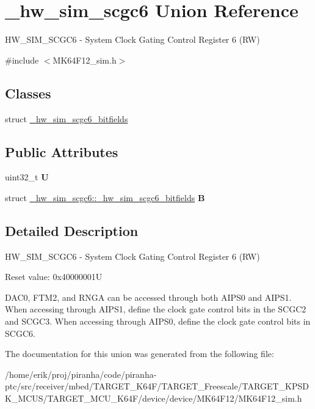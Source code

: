 \hypertarget{union__hw__sim__scgc6}{}\section{\+\_\+hw\+\_\+sim\+\_\+scgc6 Union Reference}
\label{union__hw__sim__scgc6}


H\+W\+\_\+\+S\+I\+M\+\_\+\+S\+C\+G\+C6 -\/ System Clock Gating Control Register 6 (RW)  




{\ttfamily \#include $<$M\+K64\+F12\+\_\+sim.\+h$>$}

\subsection*{Classes}
\begin{DoxyCompactItemize}
\item 
struct \hyperlink{struct__hw__sim__scgc6_1_1__hw__sim__scgc6__bitfields}{\+\_\+hw\+\_\+sim\+\_\+scgc6\+\_\+bitfields}
\end{DoxyCompactItemize}
\subsection*{Public Attributes}
\begin{DoxyCompactItemize}
\item 
uint32\+\_\+t {\bfseries U}\hypertarget{union__hw__sim__scgc6_a85465987d38225c1106793da7ad72922}{}\label{union__hw__sim__scgc6_a85465987d38225c1106793da7ad72922}

\item 
struct \hyperlink{struct__hw__sim__scgc6_1_1__hw__sim__scgc6__bitfields}{\+\_\+hw\+\_\+sim\+\_\+scgc6\+::\+\_\+hw\+\_\+sim\+\_\+scgc6\+\_\+bitfields} {\bfseries B}\hypertarget{union__hw__sim__scgc6_aba16d0bebd1a3be6d8d481d8b294c6b1}{}\label{union__hw__sim__scgc6_aba16d0bebd1a3be6d8d481d8b294c6b1}

\end{DoxyCompactItemize}


\subsection{Detailed Description}
H\+W\+\_\+\+S\+I\+M\+\_\+\+S\+C\+G\+C6 -\/ System Clock Gating Control Register 6 (RW) 

Reset value\+: 0x40000001U

D\+A\+C0, F\+T\+M2, and R\+N\+GA can be accessed through both A\+I\+P\+S0 and A\+I\+P\+S1. When accessing through A\+I\+P\+S1, define the clock gate control bits in the S\+C\+G\+C2 and S\+C\+G\+C3. When accessing through A\+I\+P\+S0, define the clock gate control bits in S\+C\+G\+C6. 

The documentation for this union was generated from the following file\+:\begin{DoxyCompactItemize}
\item 
/home/erik/proj/piranha/code/piranha-\/ptc/src/receiver/mbed/\+T\+A\+R\+G\+E\+T\+\_\+\+K64\+F/\+T\+A\+R\+G\+E\+T\+\_\+\+Freescale/\+T\+A\+R\+G\+E\+T\+\_\+\+K\+P\+S\+D\+K\+\_\+\+M\+C\+U\+S/\+T\+A\+R\+G\+E\+T\+\_\+\+M\+C\+U\+\_\+\+K64\+F/device/device/\+M\+K64\+F12/M\+K64\+F12\+\_\+sim.\+h\end{DoxyCompactItemize}
